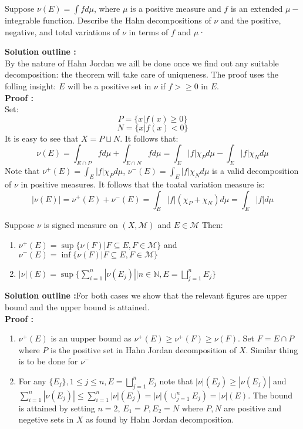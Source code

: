 \documentclass[notoc]{tufte-book}
\begin{document}
\begin{tcolorbox}[colback=c4,colframe=c3,title=Problem 3.6]
	Suppose $\nu(E) = \int f d\mu$, where $\mu$ is a positive measure and $f$ is an extended 
$\mu-$integrable function. Describe the Hahn decompositions of $\nu$ and the positive, 
negative, and total variations of $\nu$ in terms of $f$ and $\mu$·
\end{tcolorbox}
\textbf{Solution outline :}\\
By the nature of Hahn Jordan we aill be done once we find out any suitable decomposition: the theorem will take care of uniqueness. The proof uses the folling insight: $E$ will be a positive set in $\nu$  if $f>\geq0$ in $E$.\\
\textbf{Proof :}\\
Set:
$$P=\{x|f(x)\geq0\}$$
$$N=\{x|f(x)<0\}$$
It is easy to see that $X=P\sqcup N$. It follows that:
$$\nu(E)=\int_{E\cap P}fd\mu+\int_{E\cap N}fd\mu=\int_E|f|\chi_Pd\mu-\int_E|f|\chi_Nd\mu$$
Note that $\nu^+(E)=\int_E|f|\chi_Pd\mu$, $\nu^-(E)=\int_E|f|\chi_Nd\mu$ is a valid decomposition of $\nu$ in positive measures. It follows that the toatal variation measure is:
$$|\nu(E)|=\nu^+(E)+\nu^-(E)=\int_E|f|(\chi_P+\chi_N)d\mu=\int_E|f|d\mu$$


\begin{tcolorbox}[colback=c4,colframe=c3,title=Problem 3.7]
	Suppose $\nu$ is signed measure on $(X,\mathcal M)$ and $E\in\mathcal M$
	Then:
	\begin{enumerate}
		\item $\nu^+(E)=\sup\{\nu(F)|F\subseteq E,F\in\mathcal M\}$ and $\nu^-(E)=\inf\{\nu(F)|F\subseteq E,F\in\mathcal M\}$
		\item $|\nu|(E)=\sup\{\sum_{i=1}^n|\nu(E_j)||n\in \mathbb{N},E=\bigsqcup_{j=1}^n E_j\}$
	\end{enumerate}
\end{tcolorbox}
\textbf{Solution outline :}For both cases we show that the relevant figures are upper bound and the upper bound is attained.\\
\textbf{Proof :}\\
\begin{enumerate}
	\item $\nu^+(E)$ is an uupper bound as $\nu^+(E)\geq\nu^+(F)\geq \nu(F)$. Set $F=E\cap P$ where $P$ is the positive set in Hahn Jordan decomposition of $X$. Similar thing is to be done for $\nu^-$
	\item For any $\{E_j\},1\leq j\leq n,E=\bigsqcup_{j=1}^n E_j$ note that $|\nu|(E_j)\geq |\nu(E_j)|$ and $\sum_{i=1}^n|\nu(E_j)|\leq \sum_{i=1}^n|\nu|(E_j)=|\nu|\left(\cup_{j=1}^nE_j\right)=|\nu|(E)$. The bound is attained by setting $n=2$, $E_1=P,E_2=N$ where $P,N$ are positive and negetive sets in $X$ as found by Hahn Jordan decomposition.
\end{enumerate}
\end{document}
